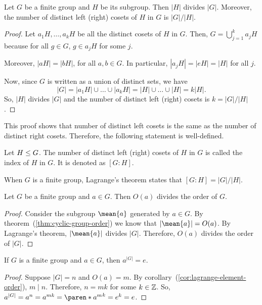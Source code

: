 \documentclass[11pt]{penrose}
\newcommand{\cyclic}[1]{\mean{#1}}
\begin{document}
\begin{nthm}[Lagrange]
    Let $G$ be a finite group and $H$ be its subgroup. Then $|H|$ divides $|G|$. Moreover, the number of distinct left (right) cosets of $H$ in $G$ is $|G|/|H|$.
\end{nthm}
\begin{proof}
    Let $a_1 H, \dots, a_k H$ be all the distinct cosets of $H$ in $G$. Then, $G = \bigcup_{j=1}^{k} a_j H$ because for all $g \in G$, $g \in a_j H$ for some $j$.

    Moreover, $|aH| = |bH|$, for all $a, b \in G$. In particular, $|a_j H| = |e H| = |H|$ for all $j$.

    Now, since $G$ is written as a union of distinct sets, we have
    \begin{equation}
        |G| = |a_1 H| \cup \dots \cup |a_k H| = |H| \cup \dots \cup |H| = k |H|.
    \end{equation}
    So, $|H|$ divides $|G|$ and the number of distinct left (right) cosets is $k = |G|/|H|$.
\end{proof}

This proof shows that number of distinct left cosets is the same as the number of distinct right cosets. Therefore, the following statement is well-defined.

\begin{ndfn}
    Let $H \mathrel{\leq} G$. The number of distinct left (right) cosets of $H$ in $G$ is called the index of $H$ in $G$. It is denoted as $[G:H]$.
\end{ndfn}

When $G$ is a finite group, Lagrange's theorem states that $[G:H] = |G|/|H|$.

\begin{ncor}\label{cor:lagrange-element-order}
    Let $G$ be a finite group and $a \in G$. Then $O(a)$ divides the order of $G$.
\end{ncor}
\begin{proof}
    Consider the subgroup $\cyclic{a}$ generated by $a \in G$. By theorem~(\ref{thm:cyclic-group-order}) we know that $|\cyclic{a}| = O(a)$. By Lagrange's theorem, $|\cyclic{a}|$ divides $|G|$. Therefore, $O(a)$ divides the order of $|G|$.
\end{proof}

\begin{ncor}
    If $G$ is a finite group and $a \in G$, then $a^{|G|} = e$.
\end{ncor}
\begin{proof}
    Suppose $|G| = n$ and $O(a) = m$. By corollary~(\ref{cor:lagrange-element-order}), $m \mid n$. Therefore, $n = mk$ for some $k \in \mathbb{Z}$. So, $a^{|G|} = a^n = a^{mk} = \paren*{a^{m}}^{k} = e^k = e$.
\end{proof}
\end{document}
